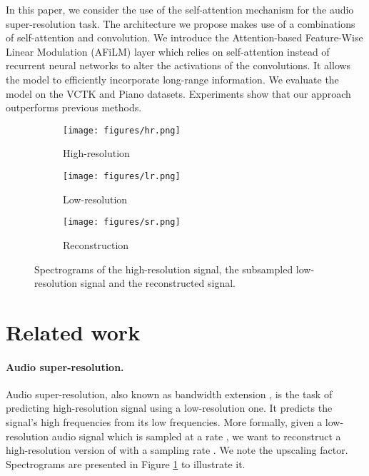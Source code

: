 \documentclass{article}
\begin{document}
In this paper, we consider the use of the self-attention mechanism for the audio super-resolution task. The architecture we propose makes use of a combinations of self-attention and convolution. We introduce the Attention-based Feature-Wise Linear Modulation (AFiLM) layer which relies on self-attention instead of recurrent neural networks to alter the activations of the convolutions. It allows the model to efficiently incorporate long-range information. We evaluate the model on the VCTK \cite{yamagishi2012english} and Piano \cite{mehri2016samplernn} datasets. Experiments show that our approach outperforms previous methods.

\begin{figure}
    \centering
    \begin{subfigure}[b]{0.15\textwidth}
        \centering
        \texttt{[image: figures/hr.png]}
        \caption{High-resolution}
    \end{subfigure}
    \begin{subfigure}[b]{0.15\textwidth}
        \centering
        \texttt{[image: figures/lr.png]}
        \caption{Low-resolution}
    \end{subfigure}
    \begin{subfigure}[b]{0.15\textwidth}
        \centering
        \texttt{[image: figures/sr.png]}
        \caption{Reconstruction}
    \end{subfigure}
    \caption{Spectrograms of the high-resolution signal, the subsampled low-resolution signal and the reconstructed signal.}
    \label{fig:spectrogram}
\end{figure}

\section{Related work}
\label{sec:related_work}
\paragraph*{Audio super-resolution.}
Audio super-resolution, also known as bandwidth extension \cite{ekstrand2002bandwidth,larsen2005audio}, is the task of predicting high-resolution signal using a low-resolution one. It predicts the signal’s high frequencies from its low frequencies. More formally, given a low-resolution audio signal  which is sampled at a rate , we want to reconstruct a high-resolution version  of  with a sampling rate . We note  the upscaling factor. Spectrograms are presented in Figure \ref{fig:spectrogram} to illustrate it.
\end{document}
